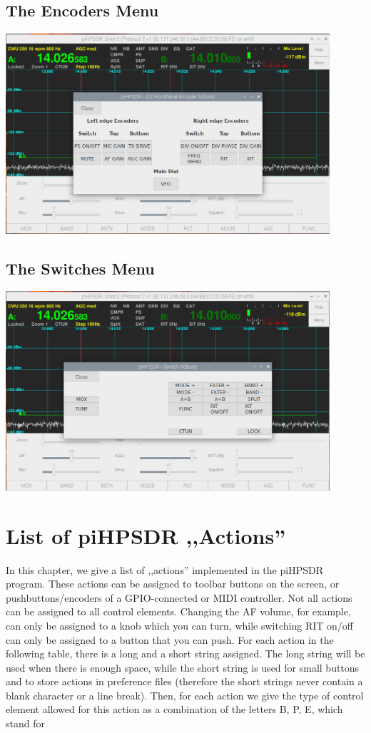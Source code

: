 \documentclass[12pt]{book}
\begin{document}
\section{The Encoders Menu}
\begin{center}
\includegraphics[width=12cm]{EncodersMenu.png}
\end{center}

\section{The Switches Menu}
\begin{center}
\includegraphics[width=12cm]{SwitchesMenu.png}
\end{center}

\chapter{List of piHPSDR ,,Actions''}
\label{ch:actions}

In this chapter, we give a list of ,,actions'' implemented in the piHPSDR program. These actions can be assigned to
toolbar buttons on the screen, or pushbuttons/encoders of a GPIO-connected or MIDI controller. Not all actions can
be assigned to all control elements. Changing the AF volume, for example, can only be assigned to a knob which
you can turn, while switching RIT on/off can only be assigned to a button that you can push. For each action
in the following table, there is a long and a short string assigned. The long string will be used when there is
enough space, while the short string is used for small buttons and to store actions in preference files (therefore
the short strings never contain a blank character or a line break). Then, for each action we give the type of control
element allowed for this action as a combination of the letters B, P, E, which stand for
\end{document}
